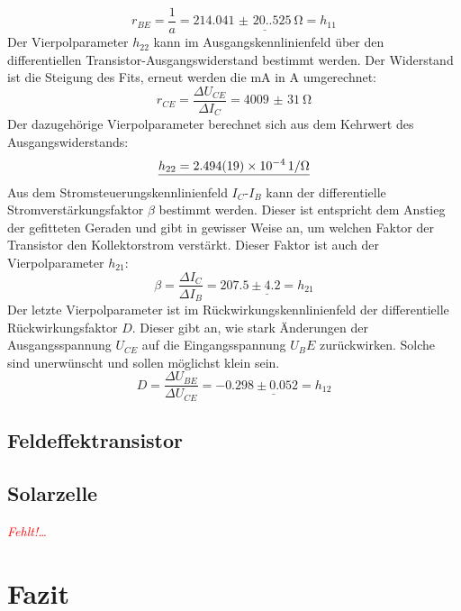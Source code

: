 \documentclass[12pt,a4paper,ngerman]{report}
\providecommand{\fehlt}{\textcolor{red}{\emph{Fehlt!\dots}}}
\begin{document}
	\begin{equation}
		r_{BE} = \frac{1}{a} = \underline{\SI{214.041(20.525)}{\ohm} = h_{11}}
	\end{equation}
	Der Vierpolparameter $h_22$ kann im Ausgangskennlinienfeld über den differentiellen Transistor-Ausgangswiderstand bestimmt werden. Der Widerstand ist die Steigung des Fits, erneut werden die \si{\milli \ampere} in \si{\ampere} umgerechnet:
	\begin{equation}
		r_{CE} =  \frac{\Delta U_{CE}}{\Delta I_{C}} = \SI{4009(31)}{\ohm}
	\end{equation}
	Der dazugehörige Vierpolparameter berechnet sich aus dem Kehrwert des Ausgangswiderstands:
	\begin{equation}
		\underline{h_{22} = \SI{2.494(19)E-4}{1 \per \ohm}}
	\end{equation}
	Aus dem Stromsteuerungskennlinienfeld $I_C$-$I_B$ kann der differentielle Stromverstärkungsfaktor $\beta$ bestimmt werden. Dieser ist entspricht dem Anstieg der gefitteten Geraden und gibt in gewisser Weise an, um welchen Faktor der Transistor den Kollektorstrom verstärkt. Dieser Faktor ist auch der Vierpolparameter $h_{21}$:
	\begin{equation}
		\beta =  \frac{\Delta I_{C}}{\Delta I_{B}} = \underline{207.5 \pm 4.2 = h_{21}}
	\end{equation}
	Der letzte Vierpolparameter ist im Rückwirkungskennlinienfeld der differentielle Rückwirkungsfaktor $D$. Dieser gibt an, wie stark Änderungen der Ausgangsspannung $U_{CE}$ auf die Eingangsspannung $U_BE$ zurückwirken. Solche sind unerwünscht und sollen möglichst klein sein. 
	\begin{equation}
		 D = \frac{\Delta U_{BE}}{\Delta U_{CE}} = \underline{-0.298 \pm 0.052 = h_{12}}
	\end{equation}

	\section{Feldeffektransistor}

	\section{Solarzelle}
	\fehlt



\chapter{Fazit}
\end{document}
